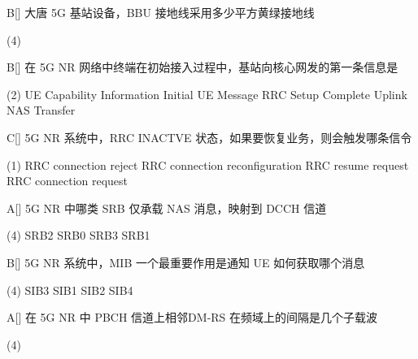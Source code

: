 \begin{choice}{B}[]
    大唐 5G 基站设备，BBU 接地线采用多少平方黄绿接地线
    \begin{tasks}(4)
    \end{tasks}
\end{choice}

\begin{choice}{B}[]
    在 5G NR 网络中终端在初始接入过程中，基站向核心网发的第一条信息是
    \begin{tasks}(2)
        \task UE Capability Information
        \task Initial UE Message
        \task  RRC Setup Complete
        \task  Uplink NAS Transfer
    \end{tasks}
\end{choice}


\begin{choice}{C}[]
    5G NR 系统中，RRC INACTVE 状态，如果要恢复业务，则会触发哪条信令
    \begin{tasks}(1)
        \task RRC connection reject
        \task RRC connection reconfiguration
        \task RRC resume request
        \task  RRC connection request
    \end{tasks}
\end{choice}


\begin{choice}{A}[]
    5G NR 中哪类 SRB 仅承载 NAS 消息，映射到 DCCH 信道
    \begin{tasks}(4)
        \task SRB2
        \task SRB0
        \task SRB3
        \task SRB1
    \end{tasks}
\end{choice}



\begin{choice}{B}[]
    5G NR 系统中，MIB 一个最重要作用是通知 UE 如何获取哪个消息
    \begin{tasks}(4)
        \task SIB3
        \task SIB1
        \task SIB2
        \task SIB4
    \end{tasks}
\end{choice}


\begin{choice}{A}[]
    在 5G NR 中 PBCH 信道上相邻DM-RS 在频域上的间隔是几个子载波
    \begin{tasks}(4)
    \end{tasks}
\end{choice}



